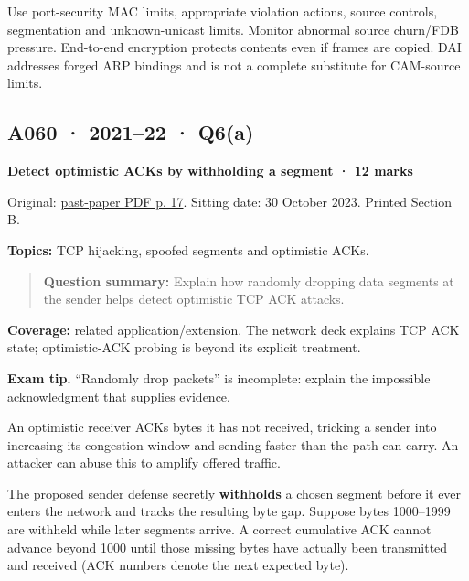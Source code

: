 \documentclass[11pt,a4paper]{article}
\begin{document}
Use port-security MAC limits,\allowbreak{} appropriate violation actions,\allowbreak{} source controls,\allowbreak{} segmentation and unknown-unicast limits. Monitor abnormal source churn/\allowbreak{}FDB pressure. End-to-end encryption protects contents even if frames are copied. DAI addresses forged ARP bindings and is not a complete substitute for CAM-source limits.




\clearpage
\subsection{A060 · 2021–22 · Q6(a)}\label{a060}

\textbf{Detect optimistic ACKs by withholding a segment · 12 marks}


Original: \href{../../CSE405-Security_Merged.pdf\#page=17}{past-paper PDF p. 17}. Sitting date: 30 October 2023. Printed Section B.


\textbf{Topics:} TCP hijacking,\allowbreak{} spoofed segments and optimistic ACKs.



\begin{quote}\small

\textbf{Question summary:} Explain how randomly dropping data segments at the sender helps detect optimistic TCP ACK attacks.



\end{quote}

\textbf{Coverage:} related application/\allowbreak{}extension. The network deck explains TCP ACK state; optimistic-ACK probing is beyond its explicit treatment.



{\color{ForestGreen}\textbf{Exam tip.} “Randomly drop packets” is incomplete: explain the impossible acknowledgment that supplies evidence.}


An optimistic receiver ACKs bytes it has not received,\allowbreak{} tricking a sender into increasing its congestion window and sending faster than the path can carry. An attacker can abuse this to amplify offered traffic.


The proposed sender defense secretly \textbf{withholds} a chosen segment before it ever enters the network and tracks the resulting byte gap. Suppose bytes 1000–1999 are withheld while later segments arrive. A correct cumulative ACK cannot advance beyond 1000 until those missing bytes have actually been transmitted and received (ACK numbers denote the next expected byte).
\end{document}
